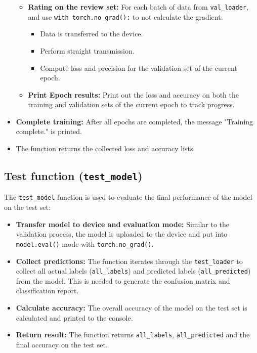 \documentclass[12pt]{article}
\begin{document}
\begin{itemize}
\begin{itemize}
        \item \textbf{Rating on the review set:} For each batch of data from \texttt{val\_loader}, and use \texttt{with torch.no\_grad():} to not calculate the gradient:
        \begin{itemize}
            \item Data is transferred to the device.
            \item Perform straight transmission.
            \item Compute loss and precision for the validation set of the current epoch.
        \end{itemize}
        \item \textbf{Print Epoch results:} Print out the loss and accuracy on both the training and validation sets of the current epoch to track progress.
    \end{itemize}
    \item \textbf{Complete training:} After all epochs are completed, the message "Training complete." is printed.
    \item The function returns the collected loss and accuracy lists.
\end{itemize}

\subsection{Test function (\texttt{test\_model})}
The \texttt{test\_model} function is used to evaluate the final performance of the model on the test set:
\begin{itemize}
    \item \textbf{Transfer model to device and evaluation mode:} Similar to the validation process, the model is uploaded to the device and put into \texttt{model.eval()} mode with \texttt{torch.no\_grad()}.
    \item \textbf{Collect predictions:} The function iterates through the \texttt{test\_loader} to collect all actual labels (\texttt{all\_labels}) and predicted labels (\texttt{all\_predicted}) from the model. This is needed to generate the confusion matrix and classification report.
    \item \textbf{Calculate accuracy:} The overall accuracy of the model on the test set is calculated and printed to the console.
    \item \textbf{Return result:} The function returns \texttt{all\_labels}, \texttt{all\_predicted} and the final accuracy on the test set.
\end{itemize}
\end{document}
